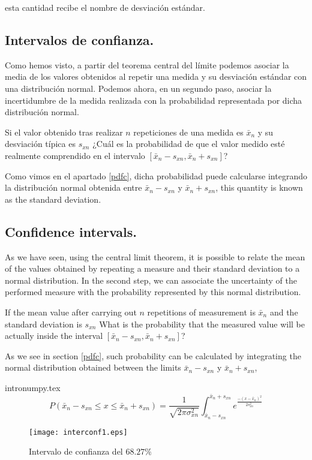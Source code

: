\begin{paracol}{2}
esta cantidad recibe el nombre de desviación estándar.

\subsection{Intervalos de confianza.}
Como hemos visto, a partir del teorema central del límite podemos asociar la media de los valores obtenidos al repetir una medida y su desviación estándar con una distribución normal. Podemos ahora, en un segundo paso, asociar la incertidumbre de la medida realizada con la probabilidad representada por dicha distribución normal.

Si el valor obtenido tras realizar $n$ repeticiones de una medida es $\bar{x}_n$ y su desviación típica es $s_{xn}$ ¿Cuál es la probabilidad de que el valor medido esté realmente comprendido en el intervalo $[\bar{x}_n-s_{xn}, \bar{x}_n+s_{xn}]$? 

Como vimos en el apartado \ref{pdfc}, dicha probabilidad puede calcularse integrando la distribución normal obtenida entre $\bar{x}_n-s_{xn}$ y $\bar{x}_n+s_{xn}$,
\switchcolumn
this quantity is known as the standard deviation.

\subsection{Confidence intervals.}
As we have seen, using the central limit theorem, it is possible to relate the mean of the values obtained by repeating a measure and their standard deviation to a normal distribution. In the second step, we can associate the uncertainty of the performed measure with the probability represented by this normal distribution.

If the mean value after carrying out $n$ repetitions of measurement is $\bar{x}_n$ and the standard deviation is $s_{xn}$ What is the probability that the measured value will be actually inside the interval $[\bar{x}_n-s_{xn}, \bar{x}_n+s_{xn}]$? 

As we see in section \ref{pdfc}, such probability can be calculated by integrating the normal distribution obtained between the limits $\bar{x}_n-s_{xn}$ y $\bar{x}_n+s_{xn}$,
\end{paracol}intronumpy.tex
\begin{equation*}
P(\bar{x}_n - s_{xn} \leqslant x \leqslant \bar{x}_n
+ s_{xn}) = \frac{1}{\sqrt{2\pi\sigma^2_{xn}}}\int_{\bar{x}_n-s_{xn}}^{\bar{x}_n+s_{xn}}e^{\frac{-(x-\bar{x}_n)^2}{2s_{xn}^2}}
\end{equation*}
\begin{figure}[h]
\centering
\texttt{[image: interconf1.eps]}
\caption{Intervalo de confianza del $68.27\%$ }
\label{fig:ic1}
\end{figure}

